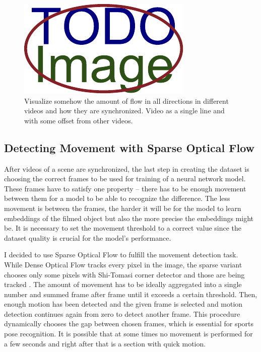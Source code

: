 \begin{figure}[ht]
    \centering
    \includegraphics{figures/placeholder.pdf}
    \caption{Visualize somehow the amount of flow in all directions in different videos and how they are synchronized. Video as a single line and with some offset from other videos.}
    \label{fig:video-synchronization}
\end{figure}

\subsection{Detecting Movement with Sparse Optical Flow}

After videos of a scene are synchronized, the last step in creating the dataset is choosing the correct frames to be used for training of a neural network model. These frames have to satisfy one property -- there has to be enough movement between them for a model to be able to recognize the difference. The less movement is between the frames, the harder it will be for the model to learn embeddings of the filmed object but also the more precise the embeddings might be. It is necessary to set the movement threshold to a correct value since the dataset quality is crucial for the model's performance.

I decided to use Sparse Optical Flow to fulfill the movement detection task. While Dense Optical Flow tracks every pixel in the image, the sparse variant chooses only some pixels with Shi-Tomasi corner detector and those are being tracked \cite{shi-tomasi-323794}. The amount of movement has to be ideally aggregated into a single number and summed frame after frame until it exceeds a certain threshold. Then, enough motion has been detected and the given frame is selected and motion detection continues again from zero to detect another frame. This procedure dynamically chooses the gap between chosen frames, which is essential for sports pose recognition. It is possible that at some times no movement is performed for a few seconds and right after that is a section with quick motion.

